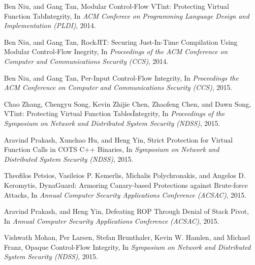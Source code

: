 \documentclass[11pt,a4paper,bibtotoc,idxtotoc,headsepline,footsepline,footexclude,BCOR20mm,DIV10]{scrbook}
\begin{document}
\begin{thebibliography}{50}
Ben Niu, and Gang Tan,
{Modular Control-Flow VTint: Protecting Virtual Function TabIntegrity}, In
\emph{ACM Conferece on Programming Language Design and Implementation (PLDI)}, 2014.

Ben Niu, and Gang Tan, 
{RockJIT: Securing Just-In-Time Compilation Using Modular Control-Flow Inegrity}, In
\emph{Proceedings of the ACM Conference on Computer and Communications Security (CCS)}, 2014.

Ben Niu, and Gang Tan,
{Per-Input Control-Flow Integrity}, In
\emph{Proceedings the ACM Conference on Computer and Communications Security (CCS)}, 2015.

Chao Zhang, Chengyu Song, Kevin Zhijie Chen, Zhaofeng Chen, and Dawn Song,
{VTint: Protecting Virtual Function Tables\' Integrity}, In
\emph{Proceedings of the Symposium on Network and Distributed System Security (NDSS)}, 2015.

Aravind Prakash, Xunchao Hu, and Heng Yin,
{Strict Protection for Virtual Function Calls in COTS C++ Binaries}, In
\emph{Symposium on Network and Distributed System Security (NDSS)}, 2015.

Theofilos Petsios, Vasileios P. Kemerlis, Michalis Polychronakis, and Angelos D. Keromytis,	
{DynaGuard: Armoring Canary-based Protections against Brute-force Attacks}, In
\emph{Annual Computer Security Applications Conference (ACSAC)}, 2015.

Aravind Prakash, and Heng Yin,
{Defeating ROP Through Denial of Stack Pivot}, In
\emph{Annual Computer Security Applications Conference (ACSAC)}, 2015.

Vishwath Mohan, Per Larsen, Stefan Brunthaler, Kevin W. Hamlen, and Michael Franz,
{Opaque Control-Flow Integrity}, In
\emph{Symposium on Network and Distributed System Security (NDSS)}, 2015.





\end{thebibliography}
\end{document}
